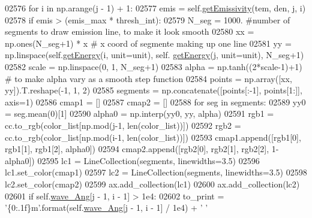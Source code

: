 \begin{DoxyCode}
02576             \textcolor{keywordflow}{for} i \textcolor{keywordflow}{in} np.arange(j - 1) + 1:
02577                 emis = self.\hyperlink{classpyneb_1_1core_1_1pynebcore_1_1_atom_aaf4e84a9d5f835e6284bd9302314f775}{getEmissivity}(tem, den, j, i)
02578                 \textcolor{keywordflow}{if} emis > (emis\_max * thresh\_int):
02579                     N\_seg = 1000. \textcolor{comment}{#number of segments to draw emission line, to make it look smooth}
02580                     xx = np.ones(N\_seg+1) * x  \textcolor{comment}{# x coord of segmente making up one line}
02581                     yy = np.linspace(self.\hyperlink{classpyneb_1_1core_1_1pynebcore_1_1_atom_a9940acb2999e864edf9761d822e65d7f}{getEnergy}(i, unit=unit), self.
      \hyperlink{classpyneb_1_1core_1_1pynebcore_1_1_atom_a9940acb2999e864edf9761d822e65d7f}{getEnergy}(j, unit=unit), N\_seg+1)
02582                     scale = np.linspace(0, 1, N\_seg+1)
02583                     alpha =  np.tanh((2*scale-1)+1)  \textcolor{comment}{# to make alpha vary as a smooth step function}
02584                     points = np.array([xx, yy]).T.reshape(-1, 1, 2) 
02585                     segments = np.concatenate([points[:-1], points[1:]], axis=1) 
02586                     cmap1 = []
02587                     cmap2 = []
02588                     \textcolor{keywordflow}{for} seg \textcolor{keywordflow}{in} segments:
02589                             yy0 = seg.mean(0)[1] 
02590                             alpha0 = np.interp(yy0, yy, alpha)
02591                             rgb1 = cc.to\_rgb(color\_list[np.mod(j-1, len(color\_list))]) 
02592                             rgb2 = cc.to\_rgb(color\_list[np.mod(i-1, len(color\_list))]) 
02593                             cmap1.append([rgb1[0], rgb1[1], rgb1[2], alpha0]) 
02594                             cmap2.append([rgb2[0], rgb2[1], rgb2[2], 1-alpha0])
02595                     lc1 = LineCollection(segments, linewidths=3.5)
02596                     lc1.set\_color(cmap1) 
02597                     lc2 = LineCollection(segments, linewidths=3.5)
02598                     lc2.set\_color(cmap2) 
02599                     ax.add\_collection(lc1) 
02600                     ax.add\_collection(lc2) 
02601                     \textcolor{keywordflow}{if} self.\hyperlink{classpyneb_1_1core_1_1pynebcore_1_1_atom_a044e1349bb63766a5f3d25fbf04b5c2c}{wave\_Ang}[j - 1, i - 1] > 1e4:
02602                         to\_print = \textcolor{stringliteral}{'\{0:.1f\}m'}.format(self.\hyperlink{classpyneb_1_1core_1_1pynebcore_1_1_atom_a044e1349bb63766a5f3d25fbf04b5c2c}{wave\_Ang}[j - 1, i - 1] / 1e4) + \textcolor{stringliteral}{' '}

\end{DoxyCode}
